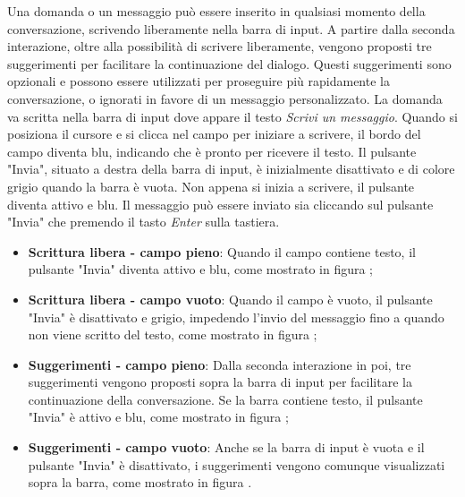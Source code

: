 Una domanda o un messaggio può essere inserito in qualsiasi momento della conversazione, scrivendo liberamente nella barra di input.  
A partire dalla seconda interazione, oltre alla possibilità di scrivere liberamente, vengono proposti tre suggerimenti per facilitare la continuazione del dialogo.  
Questi suggerimenti sono opzionali e possono essere utilizzati per proseguire più rapidamente la conversazione, o ignorati in favore di un messaggio personalizzato.  
La domanda va scritta nella barra di input dove appare il testo \textit{Scrivi un messaggio}. Quando si posiziona il cursore e si clicca nel campo per iniziare a scrivere, il bordo del campo diventa blu, indicando che è pronto per ricevere il testo.  
Il pulsante "Invia", situato a destra della barra di input, è inizialmente disattivato e di colore grigio quando la barra è vuota. Non appena si inizia a scrivere, il pulsante diventa attivo e blu.  
Il messaggio può essere inviato sia cliccando sul pulsante "Invia" che premendo il tasto \textit{Enter} sulla tastiera.  

\begin{itemize}  
\item \textbf{Scrittura libera - campo pieno}: Quando il campo contiene testo, il pulsante "Invia" diventa attivo e blu, come mostrato in figura ;
\item \textbf{Scrittura libera - campo vuoto}: Quando il campo è vuoto, il pulsante "Invia" è disattivato e grigio, impedendo l'invio del messaggio fino a quando non viene scritto del testo, come mostrato in figura ;
\item \textbf{Suggerimenti - campo pieno}: Dalla seconda interazione in poi, tre suggerimenti vengono proposti sopra la barra di input per facilitare la continuazione della conversazione. Se la barra contiene testo, il pulsante "Invia" è attivo e blu, come mostrato in figura ;
\item \textbf{Suggerimenti - campo vuoto}: Anche se la barra di input è vuota e il pulsante "Invia" è disattivato, i suggerimenti vengono comunque visualizzati sopra la barra, come mostrato in figura .
\end{itemize}

